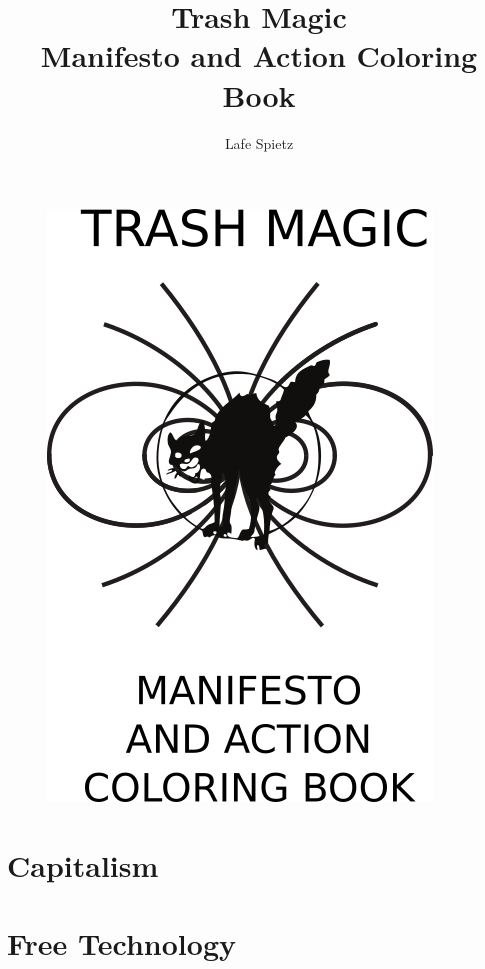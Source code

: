 \documentclass[ebook,12pt,openany,onesided]{memoir} %
\title{Trash Magic \\ Manifesto and Action Coloring Book}
\author{Lafe Spietz}
\begin{document}
\frontmatter
\begin{figure}[htbp]
\centering
\includegraphics{images/frontcover2.png}
\end{figure}

\clearpage

\clearpage



\newpage
\thispagestyle{empty}
\mbox{}



\maketitle

\tableofcontents

\listoffigures 

\mainmatter
\chapter{Capitalism}

\newpage


\chapter{Free Technology}

\newpage

\end{document}
